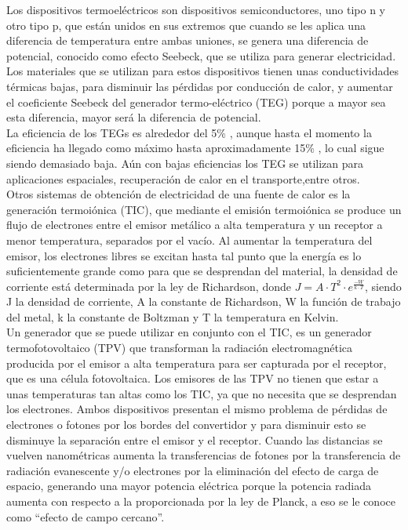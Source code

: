 Los dispositivos termoeléctricos son dispositivos semiconductores, uno tipo n y otro tipo p, que están unidos en sus extremos que cuando se les aplica una diferencia de temperatura entre ambas uniones, se genera una diferencia de potencial, conocido como efecto Seebeck, que se utiliza para generar electricidad. Los materiales que se utilizan para estos dispositivos tienen unas conductividades térmicas bajas, para disminuir las pérdidas por conducción de calor, y aumentar el coeficiente Seebeck del generador termo-eléctrico (TEG) porque a mayor sea esta diferencia, mayor será la diferencia de potencial.\\

La eficiencia de los TEGs es alrededor del 5\% \cite{TEG5efficiency}, aunque hasta el momento la eficiencia ha llegado como máximo hasta aproximadamente 15\% \cite{TEG15efficiency}, lo cual sigue siendo demasiado baja. Aún con bajas eficiencias los TEG se utilizan para aplicaciones espaciales, recuperación de calor en el transporte,entre otros.\\


Otros sistemas de obtención de electricidad de una fuente de calor es la generación termoiónica (TIC), que mediante el emisión termoiónica se produce un flujo de electrones entre el emisor metálico a alta temperatura y un receptor a menor temperatura, separados por el vacío. Al aumentar la temperatura del emisor, los electrones libres se excitan hasta tal punto que la energía es lo suficientemente grande como para que se desprendan del material, la densidad de corriente está determinada por la ley de Richardson, donde $J=A\cdot T^2\cdot e^{\frac{-W}{k\cdot T}}$, siendo J la densidad de corriente, A la constante de Richardson, W la función de trabajo del metal, k la constante de Boltzman y T la temperatura en Kelvin.\\

Un generador que se puede utilizar en conjunto con el TIC, es un generador termofotovoltaico (TPV) que transforman la radiación electromagnética producida por el emisor a alta temperatura para ser capturada por el receptor, que es una célula fotovoltaica. Los emisores de las TPV no tienen que estar a unas temperaturas tan altas como los TIC, ya que no necesita que se desprendan los electrones. Ambos dispositivos presentan el mismo problema de pérdidas de electrones o fotones por los bordes del convertidor y para disminuir esto se disminuye la separación entre el emisor y el receptor. Cuando las distancias se vuelven nanométricas aumenta la transferencias de fotones por la transferencia de radiación evanescente y/o electrones por la eliminación del efecto de carga de espacio, generando una mayor potencia eléctrica porque la potencia radiada aumenta con respecto a la proporcionada por la ley de Planck, a eso se le conoce como ``efecto de campo cercano''.\\

